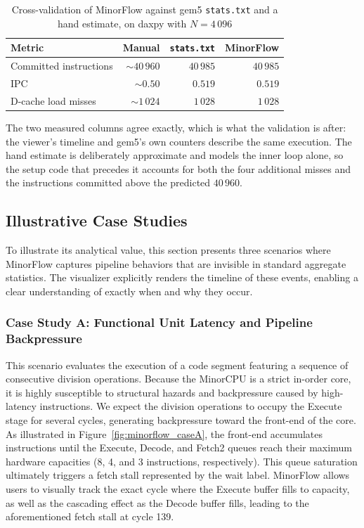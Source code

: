 \documentclass[runningheads,a4paper]{llncs}
\begin{document}
\begin{table}[ht]
  \centering
  \caption{Cross-validation of MinorFlow against gem5
           \texttt{stats.txt} and a hand estimate, on daxpy with
           \(N=4\,096\)}
  \label{tab:daxpy_validation}
  \begin{tabular*}{0.8\textwidth}{@{\extracolsep{\fill}}lrrr@{}}
    \toprule
    Metric                  & Manual         & \texttt{stats.txt} & MinorFlow  \\
    \midrule
    Committed instructions  & $\sim 40\,960$  & $40\,985$        & $40\,985$   \\
    IPC                     & $\sim 0.50$     & $0.519$          & $0.519$     \\
    D-cache load misses     & $\sim 1\,024$   & $1\,028$         & $1\,028$    \\
    \bottomrule
  \end{tabular*}
\end{table}

The two measured columns agree exactly, which is what the validation is after: the viewer's timeline and gem5's own counters describe the same execution. The hand estimate is deliberately approximate and models the inner loop alone, so the setup code that precedes it accounts for both the four additional misses and the instructions committed above the predicted \(40\,960\).

\subsection{Illustrative Case Studies}

To illustrate its analytical value, this section presents three scenarios where MinorFlow captures pipeline behaviors that are invisible in standard aggregate statistics. The visualizer explicitly renders the timeline of these events, enabling a clear understanding of exactly when and why they occur.

\subsubsection{Case Study A: Functional Unit Latency and Pipeline Backpressure}

This scenario evaluates the execution of a code segment featuring a sequence of consecutive division operations. Because the MinorCPU is a strict in-order core, it is highly susceptible to structural hazards and backpressure caused by high-latency instructions. We expect the division operations to occupy the Execute stage for several cycles, generating backpressure toward the front-end of the core. As illustrated in Figure~\ref{fig:minorflow_caseA}, the front-end accumulates instructions until the Execute, Decode, and Fetch2 queues reach their maximum hardware capacities (8, 4, and 3 instructions, respectively). This queue saturation ultimately triggers a fetch stall represented by the wait label. MinorFlow allows users to visually track the exact cycle where the Execute buffer fills to capacity, as well as the cascading effect as the Decode buffer fills, leading to the aforementioned fetch stall at cycle 139.
\end{document}
